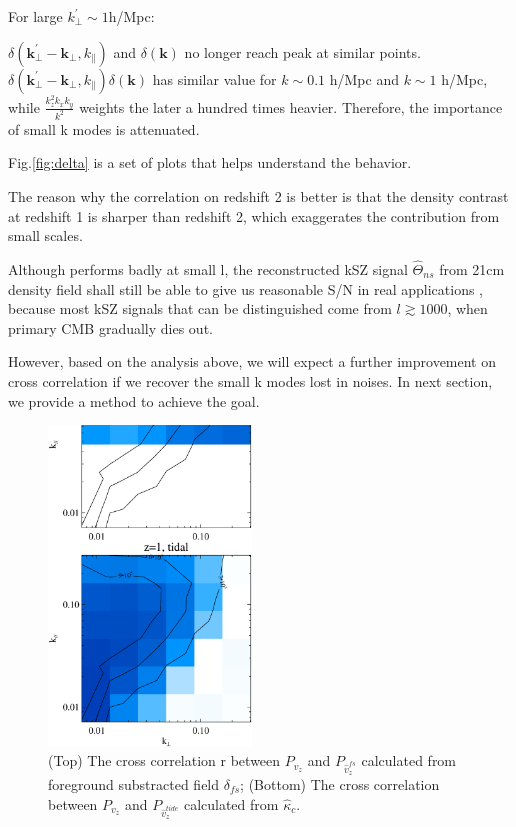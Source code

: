 For large $k_\perp^\prime\sim 1$h/Mpc:

$\delta(\bm{k_\perp^{\prime}}-\bm{k_\perp},k_\parallel)$ and $\delta(\bm{k})$ 
no longer reach peak at similar points.  
$\delta(\bm{k_\perp^{\prime}}-\bm{k_\perp},k_\parallel)\delta(\bm{k})$ 
has similar value for $k\sim 0.1$ h/Mpc and $k\sim 1$ h/Mpc, 
while $\frac{k_z^2k_xk_y}{k^2}$ weights the later a hundred times heavier.
Therefore, the importance of small k modes is attenuated.

Fig.\ref{fig:delta} is a set of plots that helps understand the behavior.

The reason why the correlation on redshift 2 is better is that 
the density contrast at redshift 1 is sharper than redshift 2, 
which exaggerates the contribution from small scales.

Although performs badly at small l, the reconstructed kSZ signal $\hat \Theta_{ns}$ 
from 21cm density field shall still be able to give us reasonable S/N in real applications  
, because most kSZ signals that can be distinguished come from $l\gtrsim 1000$, when primary CMB gradually dies out. 

However, based on the analysis above, 
we will expect a further improvement on cross correlation 
if we recover the small k modes lost in noises. 
In next section, we provide a method to achieve the goal.


\begin{figure}[tbp]
\begin{center}
\includegraphics[width=0.48\textwidth]{compare_powv2d_z1z2.eps}
\end{center}
\vspace{-0.7cm}
\caption{(Top) The cross correlation r between $P_{v_z}$ and 
    $P_{\hat v_z^{fs}}$ calculated from foreground substracted field $\delta_{fs}$; 
    (Bottom) The cross correlation between $P_{v_z}$ and $P_{\hat v_z^{tide}}$ calculated from $\hat \kappa_c$. 
}
\label{fig:v}
\end{figure}
